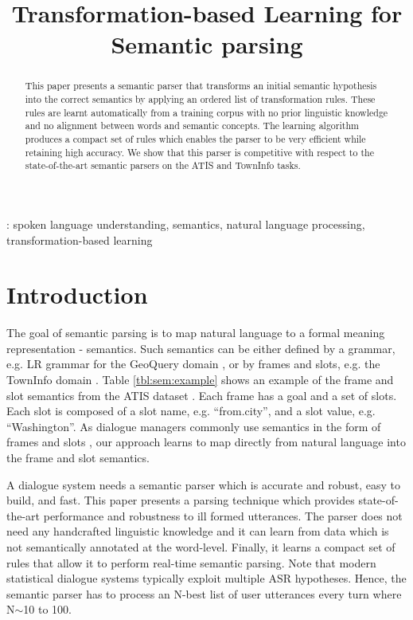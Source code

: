 \documentclass{article}
\title{Transformation-based Learning for Semantic parsing}
\begin{document}
\maketitle
%
\begin{abstract}
This paper presents a semantic parser that transforms an initial semantic hypothesis into the correct semantics by applying an ordered list of transformation rules. These rules are learnt automatically from a training corpus with no prior linguistic knowledge and no alignment between words and semantic concepts. The learning algorithm produces a compact set of rules which enables the parser to be very efficient while retaining high accuracy. We show that this parser is competitive with respect to the state-of-the-art semantic parsers on the ATIS and TownInfo tasks.
\end{abstract}
\vspace{0.1cm}
: spoken language understanding, semantics, natural language processing, transformation-based learning


\section{Introduction}
The goal of semantic parsing is to map natural language to a formal meaning representation - semantics. Such semantics can be either defined by a grammar, e.g. LR grammar for the GeoQuery domain \cite{kate05}, or by frames and slots, e.g. the TownInfo domain \cite{mairesse09}. Table \ref{tbl:sem:example} shows an example of the frame and slot semantics from the ATIS dataset \cite{atis94}. Each frame has a goal and a set of slots. Each slot is composed of a slot name, e.g. ``from.city'',
and a slot value, e.g. ``Washington''. As dialogue managers commonly use semantics in the form of frames and slots \cite{williams07,thomson08}, our approach learns to map directly from natural language into the frame and slot semantics.


A dialogue system needs a semantic parser which is accurate and robust, easy to build, and fast. This paper presents a parsing technique which provides state-of-the-art performance and robustness to ill formed utterances. The parser does not need any handcrafted linguistic knowledge and it can learn from data which is not semantically annotated at the word-level. Finally, it learns a compact set of rules that allow it to perform real-time semantic parsing. Note that modern statistical dialogue systems typically exploit multiple ASR hypotheses. Hence, the semantic parser has to process an N-best list of user utterances every turn where N$\sim$10 to 100.
\end{document}
